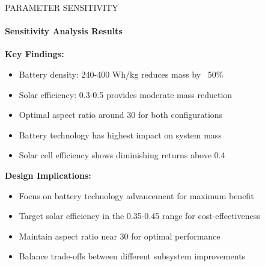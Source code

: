 \documentclass{beamer}
\begin{document}
\begin{frame}{PARAMETER SENSITIVITY}
    \framesubtitle{Sensitivity Analysis Results}
    
    \textbf{Key Findings:}
    \begin{itemize}
        \item Battery density: 240-400 Wh/kg reduces mass by ~50\%
        \item Solar efficiency: 0.3-0.5 provides moderate mass reduction
        \item Optimal aspect ratio around 30 for both configurations
        \item Battery technology has highest impact on system mass
        \item Solar cell efficiency shows diminishing returns above 0.4
    \end{itemize}
    
    \vspace{0.5cm}
    \textbf{Design Implications:}
    \begin{itemize}
        \item Focus on battery technology advancement for maximum benefit
        \item Target solar efficiency in the 0.35-0.45 range for cost-effectiveness
        \item Maintain aspect ratio near 30 for optimal performance
        \item Balance trade-offs between different subsystem improvements
    \end{itemize}
\end{frame}
\end{document}

